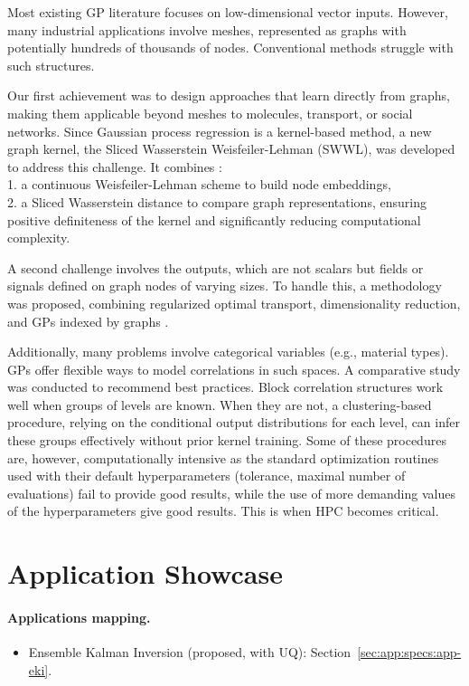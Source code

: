 Most existing GP literature focuses on low-dimensional vector inputs. However, many industrial applications involve meshes, represented as graphs with potentially hundreds of thousands of nodes. Conventional methods struggle with such structures.

Our first achievement was to design approaches that learn directly from graphs, making them applicable beyond meshes to molecules, transport, or social networks.
Since Gaussian process regression is a kernel-based method,
a new graph kernel, the Sliced Wasserstein Weisfeiler-Lehman (SWWL), was developed to address this challenge. It combines \cite{carpintero2024}:\\
	1.	a continuous Weisfeiler-Lehman scheme to build node embeddings,\\
	2.	a Sliced Wasserstein distance to compare graph representations, ensuring positive definiteness of the kernel and significantly reducing computational complexity.

A second challenge involves the outputs, which are not scalars but fields or signals defined on graph nodes of varying sizes. To handle this, a methodology was proposed, combining regularized optimal transport, dimensionality reduction, and GPs indexed by graphs \cite{carpintero2025}.

Additionally, many problems involve categorical variables (e.g., material types). GPs offer flexible ways to model correlations in such spaces. A comparative study was conducted to recommend best practices. Block correlation structures work well when groups of levels are known. When they are not, a clustering-based procedure, relying on the conditional output distributions for each level, can infer these groups effectively without prior kernel training.
Some of these procedures are, however, computationally intensive as the standard optimization routines used with their default hyperparameters (tolerance, maximal number of evaluations) fail to provide good results, while the use of more demanding values of the hyperparameters give good results. This is when HPC becomes critical.

\section{Application Showcase}
%   

\paragraph{Applications mapping.}
\begin{itemize}
	\item Ensemble Kalman Inversion (proposed, with UQ): Section~\ref{sec:app:specs:app-eki}.
\end{itemize}

